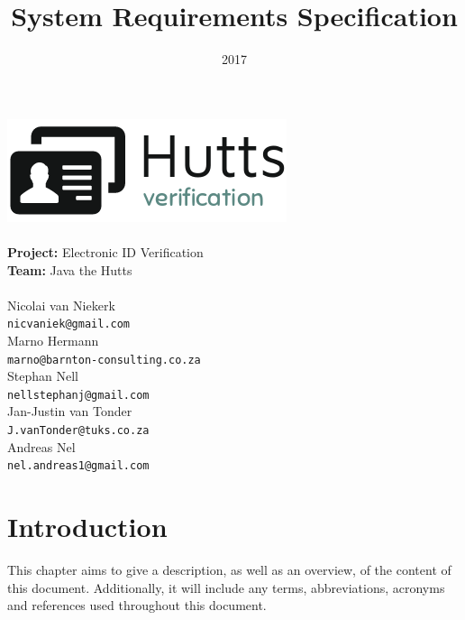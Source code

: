 \documentclass{article}
\title{System Requirements Specification}
\date{2017}
\begin{document}
\makeatletter
    \begin{titlepage}
        \begin{center}
            {\includegraphics[width=0.7\linewidth]{img/hutts-verification.png}}\\[2ex]
            \vspace{3cm}
            {\huge \bfseries \@title }\\[2ex]
            {\LARGE \textbf{Project:} Electronic ID Verification}\\[2ex]
            {\LARGE \textbf{Team:} Java the Hutts}\\[2ex]
            {\LARGE \@date}\\[2ex]
            \vspace{3cm}
            {\large  Nicolai van Niekerk\\ \texttt{nicvaniek@gmail.com}}\\[2ex]
            {\large  Marno Hermann\\ \texttt{marno@barnton-consulting.co.za}}\\[2ex]
            {\large  Stephan Nell\\ \texttt{nellstephanj@gmail.com}}\\[2ex]
            {\large  Jan-Justin van Tonder\\ \texttt{J.vanTonder@tuks.co.za}}\\[2ex]
            {\large  Andreas Nel\\ \texttt{nel.andreas1@gmail.com}}\\[2ex]
        \end{center}
    \end{titlepage}
\makeatother

\cleardoublepage
\thispagestyle{empty}
\tableofcontents
\newpage

\setcounter{page}{1}
	\section{Introduction}\label{sec:intro}
		This chapter aims to give a description, as well as an overview, of the content of this document. Additionally, it will include any terms, abbreviations, acronyms and references used throughout this document.
\end{document}
